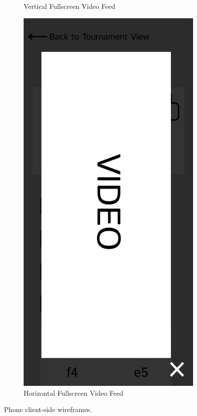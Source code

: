 \begin{figure}[h!]
\begin{subfigure}[h!]{0.2\linewidth}
        \caption{Vertical Fullscreen Video Feed}
        \label{fig:phone-fullscreen-video-vertical}
    \end{subfigure}
    \hfill
    \begin{subfigure}[h!]{0.2\linewidth}
        \centering
        \includegraphics[width=\linewidth]{figures/methods/wireframes/phone-full-screen-video-view-horizontal.png}
        \caption{Horizontal Fullscreen Video Feed}
        \label{fig:phone-fullscreen-video-horizontal}
    \end{subfigure}
    
    \caption{Phone client-side wireframes.}
    \label{fig:phone-view-group}
\end{figure}

